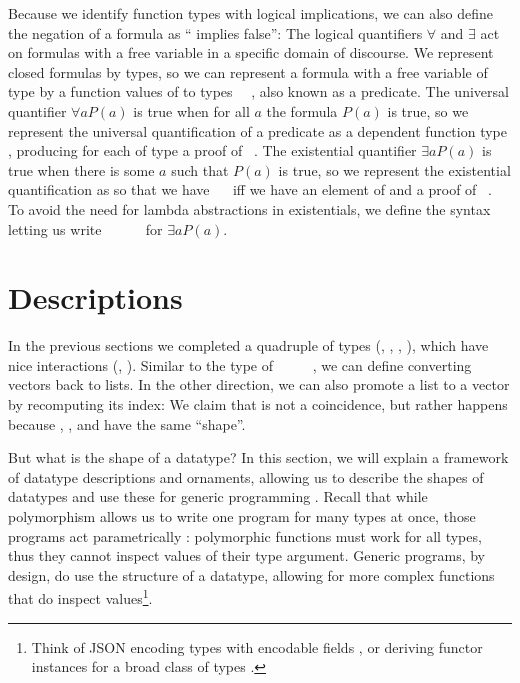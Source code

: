Because we identify function types with logical implications, we can also define the negation of a formula  as `` implies false'':
The logical quantifiers $\forall$ and $\exists$ act on formulas with a free variable in a specific domain of discourse. We represent closed formulas by types, so we can represent a formula with a free variable of type  by a function values of  to types \ \ , also known as a predicate. The universal quantifier $\forall a P(a)$ is true when for all $a$ the formula $P(a)$ is true, so we represent the universal quantification of a predicate  as a dependent function type , producing for each  of type  a proof of \ . The existential quantifier $\exists a P(a)$ is true when there is some $a$ such that $P(a)$ is true, so we represent the existential quantification as
so that we have \ \  iff we have an element  of  and a proof  of \ . To avoid the need for lambda abstractions in existentials, we define the syntax
letting us write \AD{Σ[}\ \ \ \ \AD{]}\  for $\exists a P(a)$.

\section{Descriptions}\label{sec:background-descriptions}
In the previous sections we completed a quadruple of types (\bN{}, , , ), 
which have nice interactions (, ). Similar to the type of \ \AV{:}\ \ \ \ \bN{}, we can define
converting vectors back to lists. In the other direction, we can also promote a list to a vector by recomputing its index:
We claim that is not a coincidence, but rather happens because \bN{}, , and  have the same ``shape''.

But what is the shape of a datatype? In this section, we will explain a framework of datatype descriptions and ornaments, allowing us to describe the shapes of datatypes and use these for generic programming \cite{ulftutorial, genericsamm, effectfully, practgen}. Recall that while polymorphism allows us to write one program for many types at once, those programs act parametrically \cite{reynolds1983types, wadlerfree}: polymorphic functions must work for all types, thus they cannot inspect values of their type argument. Generic programs, by design, do use the structure of a datatype, allowing for more complex functions that do inspect values\footnote{Think of JSON encoding types with encodable fields \cite{truesop}, or deriving functor instances for a broad class of types \cite{haskellderiving}.}.


